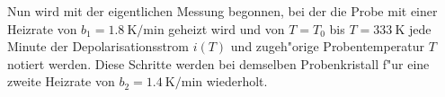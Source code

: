   Nun wird mit der eigentlichen Messung begonnen, bei der die Probe mit einer Heizrate von $b_1=\SI{1,8}{\kelvin}/\si{\minute}$ geheizt wird und von $T=T_0$ bis $T=\SI{333}{\kelvin}$ jede Minute der Depolarisationsstrom $i(T)$ und zugeh"orige Probentemperatur $T$ notiert werden.
  Diese Schritte werden bei demselben Probenkristall f"ur eine zweite Heizrate von $b_2=\SI{1,4}{\kelvin}/\si{\minute}$ wiederholt.
